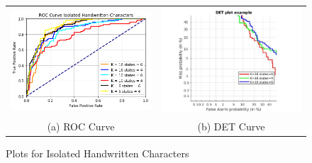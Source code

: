 \begin{figure}[h!]
	\hspace*{0cm}\begin{tabular}{cc}
		\includegraphics[width=70mm]{HMM/roc_handwritten_multiple_Ks.png} & \includegraphics[width=70mm]{HMM/nit_char_dtw.jpg} \\
		(a) ROC Curve & (b) DET Curve\\[4pt]
		
	\end{tabular}\hspace*{0cm}
	\caption{Plots for Isolated Handwritten Characters}
\end{figure}